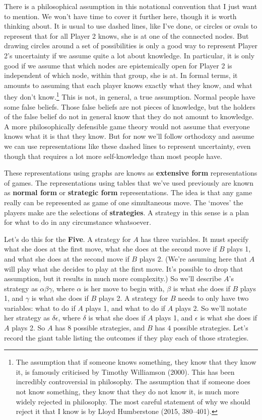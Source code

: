 \documentclass[
  11pt,
  letterpaper,
]{scrbook}
\begin{document}
There is a philosophical assumption in this notational convention that I
just want to mention. We won't have time to cover it further here,
though it is worth thinking about. It is usual to use dashed lines, like
I've done, or circles or ovals to represent that for all Player 2 knows,
she is at one of the connected nodes. But drawing circles around a set
of possibilities is only a good way to represent Player 2's uncertainty
if we assume quite a lot about knowledge. In particular, it is only good
if we assume that which nodes are epistemically open for Player 2 is
independent of which node, within that group, she is at. In formal
terms, it amounts to assuming that each player knows exactly what they
know, and what they don't know.\footnote{The assumption that if someone
  knows something, they know that they know it, is famously criticised
  by Timothy Williamson (2000). This has been incredibly controversial
  in philosophy. The assumption that if someone does not know something,
  they know that they do not know it, is much more widely rejected in
  philosophy. The most careful statement of why we should reject it that
  I know is by Lloyd Humberstone (2015, 380--401).} This is not, in
general, a true assumption. Normal people have some false beliefs. Those
false beliefs are not pieces of knowledge, but the holders of the false
belief do not in general know that they do not amount to knowledge. A
more philosophically defensible game theory would not assume that
everyone knows what it is that they know. But for now we'll follow
orthodoxy and assume we can use representations like these dashed lines
to represent uncertainty, even though that requires a lot more
self-knowledge than most people have.

These representations using graphs are knows as \textbf{extensive form}
representations of games. The representations using tables that we've
used previously are known as \textbf{normal form} or \textbf{strategic
form} representations. The idea is that any game really can be
represented as game of one simultaneous move. The `moves' the players
make are the selections of \textbf{strategies}. A strategy in this sense
is a plan for what to do in any circumstance whatsoever.

Let's do this for the \textbf{Five}. A strategy for \(A\) has three
variables. It must specify what she does at the first move, what she
does at the second move if \(B\) plays 1, and what she does at the
second move if \(B\) plays 2. (We're assuming here that \(A\) will play
what she decides to play at the first move. It's possible to drop that
assumption, but it results in much more complexity.) So we'll describe
\(A\)'s strategy as \(\alpha \beta \gamma\), where \(\alpha\) is her
move to begin with, \(\beta\) is what she does if \(B\) plays 1, and
\(\gamma\) is what she does if \(B\) plays 2. A strategy for \(B\) needs
to only have two variables: what to do if \(A\) plays 1, and what to do
if \(A\) plays 2. So we'll notate her strategy as \(\delta \epsilon\),
where \(\delta\) is what she does if \(A\) plays 1, and \(\epsilon\) is
what she does if \(A\) plays 2. So \(A\) has 8 possible strategies, and
\(B\) has 4 possible strategies. Let's record the giant table listing
the outcomes if they play each of those strategies.
\end{document}
